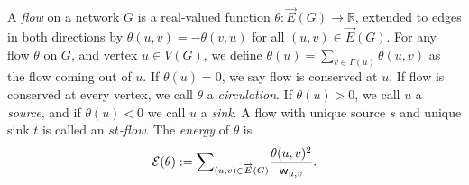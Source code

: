 \documentclass{article}
\renewcommand{\>}{\rangle}
\newcommand{\<}{\langle}
\renewcommand{\(}{\left(}
\renewcommand{\)}{\right)}
\def\w{{\sf w}}
\begin{document}
\begin{definition}\label{def:flow}
A \emph{flow} on a network $G$ is a real-valued function $\theta:\overrightarrow{E}(G)\rightarrow\mathbb{R}$, extended to edges in both directions by $\theta(u,v)=-\theta(v,u)$ for all $(u,v)\in\overrightarrow{E}(G)$. 
For any flow $\theta$ on $G$, and vertex $u\in V(G)$, we define $\theta(u)=\sum_{v\in \Gamma(u)}\theta(u,v)$ as the flow coming out of $u$. If $\theta(u)=0$, we say flow is conserved at $u$. If flow is conserved at every vertex, we call $\theta$ a \emph{circulation}. 
If $\theta(u)>0$, we call $u$ a \emph{source}, and if $\theta(u)<0$ we call $u$ a \emph{sink}. A flow with unique source $s$ and unique sink $t$ is called an \emph{$st$-flow}. 
The \emph{energy} of $\theta$ is 
$${\cal E}(\theta):=\textstyle{\displaystyle\sum}_{(u,v)\in\overrightarrow{E}(G)}\displaystyle\frac{\theta(u,v)^2}{\w_{u,v}}.$$
\end{definition}
\end{document}
